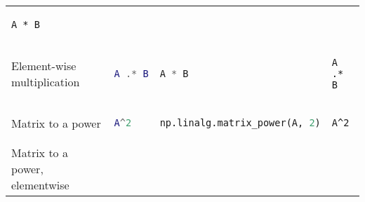 \documentclass[10pt, landscape]{article}
\begin{document}
\begin{multicols}{2}
\begin{tabular}[]{@{}llll@{}}
\begin{minipage}[t]{0.20\columnwidth}
\begin{lstlisting}
A * B
\end{lstlisting}
\strut
\end{minipage}\tabularnewline
\begin{minipage}[t]{0.23\columnwidth}\raggedright\strut
Element-wise multiplication\strut
\end{minipage} & \begin{minipage}[t]{0.22\columnwidth}\raggedright\strut
\begin{lstlisting}[language=Matlab]
A .* B
\end{lstlisting}
\strut
\end{minipage} & \begin{minipage}[t]{0.23\columnwidth}\raggedright\strut
\begin{lstlisting}[language=Python]
A * B
\end{lstlisting}
\strut
\end{minipage} & \begin{minipage}[t]{0.20\columnwidth}\raggedright\strut
\begin{lstlisting}
A .* B
\end{lstlisting}
\strut
\end{minipage}\tabularnewline
\begin{minipage}[t]{0.23\columnwidth}\raggedright\strut
Matrix to a power\strut
\end{minipage} & \begin{minipage}[t]{0.22\columnwidth}\raggedright\strut
\begin{lstlisting}[language=Matlab]
A^2
\end{lstlisting}
\strut
\end{minipage} & \begin{minipage}[t]{0.23\columnwidth}\raggedright\strut
\begin{lstlisting}[language=Python]
np.linalg.matrix_power(A, 2)
\end{lstlisting}
\strut
\end{minipage} & \begin{minipage}[t]{0.20\columnwidth}\raggedright\strut
\begin{lstlisting}
A^2
\end{lstlisting}
\strut
\end{minipage}\tabularnewline
\begin{minipage}[t]{0.23\columnwidth}\raggedright\strut
Matrix to a power, elementwise\strut
\end{minipage} & \begin{minipage}[t]{0.22\columnwidth}\raggedright\strut

\end{minipage}
\end{tabular}
\end{multicols}
\end{document}
